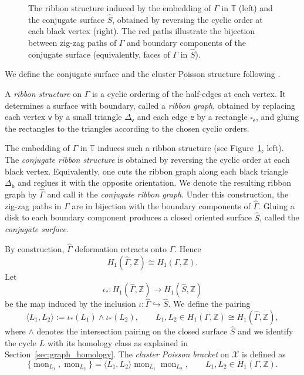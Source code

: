 \documentclass[dvipsnames,11pt]{article}
\theoremstyle{definition}
\newcommand{\Z}{{\mathbb Z}}
\newcommand{\T}{{\mathbb T}}
\def\b{\mathsf b}
\def\vert{\mathsf v}
\def\e{\mathsf e}
\def\graph{\Gamma}
\def\mon{\operatorname{mon}}
\newcommand{\la}{\label}
\begin{document}
\begin{figure}
\begin{center}
\end{center}


\caption{The ribbon structure induced by the embedding of $\Gamma$ in $\T$ (left) and the conjugate surface $\widehat S$, obtained by reversing the cyclic order at each black vertex (right). The red paths illustrate the bijection between zig-zag paths of $\Gamma$ and boundary components of the conjugate surface (equivalently, faces of $\graph$ in $\widehat S$).} \la{fig:conj_surface}
\end{figure}

We define the conjugate surface and the cluster Poisson structure following \cite[\S1.1.1]{GK13}.

A \emph{ribbon structure} on $\Gamma$ is a cyclic ordering of the half-edges at each vertex. It determines a surface with boundary, called a \emph{ribbon graph}, obtained by replacing each vertex $\vert$ by a small triangle $\Delta_\vert$ and each edge $\e$ by a rectangle $\square_\e$, and gluing the rectangles to the triangles according to the chosen cyclic orders.

The embedding of $\Gamma$ in $\T$ induces such a ribbon structure (see Figure~\ref{fig:conj_surface}, left). The \emph{conjugate ribbon structure} is obtained by reversing the cyclic order at each black vertex. Equivalently, one cuts the ribbon graph along each black triangle $\Delta_\b$ and reglues it with the opposite orientation. We denote the resulting ribbon graph by $\widehat\Gamma$ and call it the \emph{conjugate ribbon graph}. Under this construction, the zig-zag paths in $\Gamma$ are in bijection with the boundary components of $\widehat\Gamma$. Gluing a disk to each boundary component produces a closed oriented surface $\widehat S$, called the \emph{conjugate surface}.

By construction, $\widehat\Gamma$ deformation retracts onto $\Gamma$. Hence
\[
H_1(\widehat\Gamma,\Z)\cong H_1(\Gamma,\Z).
\]
Let
\[
\iota_*:H_1(\widehat\Gamma,\Z)\rightarrow H_1(\widehat S,\Z)
\]
be the map induced by the inclusion $\iota:\widehat\Gamma\hookrightarrow \widehat S$. We define the pairing
\[
\langle L_1,L_2 \rangle:= \iota_*(L_1)\wedge \iota_*(L_2),
\qquad L_1,L_2\in H_1(\Gamma,\Z)\cong H_1(\widehat\Gamma,\Z),
\]
where $\wedge$ denotes the intersection pairing on the closed surface $\widehat S$ and we identify the cycle $L$ with its homology class as explained in Section~\ref{sec:graph_homology}. The \emph{cluster Poisson bracket} on $\mathcal X$ is defined as
\[
\{\mon_{L_1},\mon_{L_2}\}
=
\langle L_1,L_2 \rangle \mon_{L_1}\mon_{L_2},
\qquad L_1,L_2\in H_1(\Gamma,\Z).
\]
\end{document}
